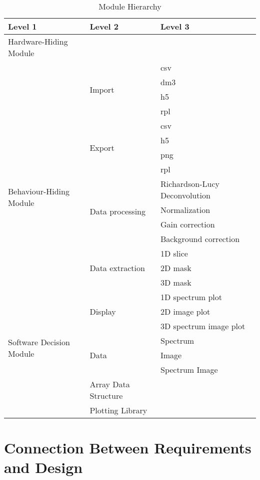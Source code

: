 \documentclass[12pt, titlepage]{article}
\begin{document}
\begin{table}[h!]
\centering
\begin{tabular}{p{} p{} p{}}
\toprule
\textbf{Level 1} & \textbf{Level 2} & \textbf{Level 3}\\
\midrule

{Hardware-Hiding Module} & ~ & ~ \\
\midrule

\multirow{18}{0.25\textwidth}{Behaviour-Hiding Module} & \multirow{4}{0.25\textwidth}{Import} & csv\\
& & dm3\\
& & h5\\
& & rpl\\\cline{2-3}
& \multirow{4}{0.25\textwidth}{Export} & csv\\
& & h5\\
& & png\\
& & rpl\\\cline{2-3}
& \multirow{4}{0.25\textwidth}{Data processing} & Richardson-Lucy Deconvolution\\
& & Normalization\\
& & Gain correction\\
& & Background correction\\\cline{2-3}
& \multirow{3}{0.25\textwidth}{Data extraction} & 1D slice\\
& & 2D mask\\
& & 3D mask\\\cline{2-3}
& \multirow{3}{0.25\textwidth}{Display} & 1D spectrum plot\\
& & 2D image plot\\
& & 3D spectrum image plot\\
\midrule

\multirow{2}{0.25\textwidth}{Software Decision Module} & \multirow{3}{0.25\textwidth}{Data} & Spectrum\\
& & Image\\
& & Spectrum Image\\\cline{2-3}
& Array Data Structure\\\cline{2-3}
& Plotting Library\\

\bottomrule

\end{tabular}
\caption{Module Hierarchy}
\label{TblMH}
\end{table}

\section{Connection Between Requirements and Design} \label{SecConnection}
\end{document}
